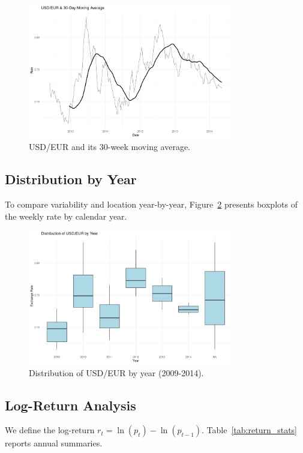 \documentclass[11pt,a4paper]{article}
\begin{document}
    \begin{figure}[H]
    \centering
    \includegraphics[width=0.8\textwidth]{figures/usdeur_ma30.png}
    \caption{USD/EUR and its 30-week moving average.}
    \label{fig:ma}
    \end{figure}

    \subsection{Distribution by Year}
    To compare variability and location year-by-year, Figure~\ref{fig:box} presents boxplots of the weekly rate by calendar year.

    \begin{figure}[H]
    \centering
    \includegraphics[width=0.8\textwidth]{figures/usdeur_boxplot_year.png}
    \caption{Distribution of USD/EUR by year (2009-2014).}
    \label{fig:box}
    \end{figure}

    \subsection{Log-Return Analysis}
    We define the log-return \(r_t = \ln(p_t) - \ln(p_{t-1})\).  Table~\ref{tab:return_stats} reports annual summaries.
\end{document}
